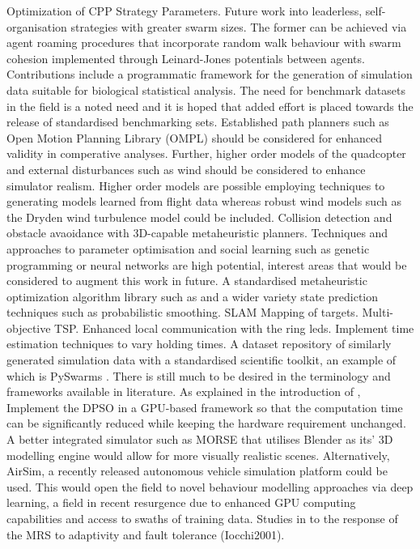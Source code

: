 \documentclass{report}
\begin{document}
Optimization of CPP Strategy Parameters. Future work into leaderless, self-organisation strategies with greater swarm sizes. The former can be achieved via agent roaming procedures that incorporate random walk behaviour with swarm cohesion implemented through Leinard-Jones potentials between agents.
Contributions include a programmatic framework for the generation of simulation data suitable for biological statistical analysis. The need for benchmark datasets in the field is a noted need and it is hoped that added effort is placed towards the release of standardised benchmarking sets.
Established path planners such as Open Motion Planning Library (OMPL) \cite{Sucan2012} should be considered for enhanced validity in comperative analyses. Further, higher order models of the quadcopter and external disturbances such as wind should be considered to enhance simulator realism. Higher order models are possible employing techniques to generating models learned from flight data \cite{Symington2014} whereas robust wind models such as the Dryden wind turbulence model \cite{Dryden} could be included. Collision detection and obstacle avaoidance with 3D-capable metaheuristic planners. Techniques and approaches to parameter optimisation and social learning such as genetic programming or neural networks are high potential, interest areas that would be considered to augment this work in future.
A standardised metaheuristic optimization algorithm library such as \cite{James2018} and a wider variety state prediction techniques such as probabilistic smoothing.
SLAM Mapping of targets.
Multi-objective TSP.
Enhanced local communication with the ring leds.
Implement time estimation techniques to vary holding times.
A dataset repository of similarly generated simulation data with a standardised scientific toolkit, an example of which is PySwarms \cite{James2018}.
There is still much to be desired in the terminology and frameworks available in literature.
As explained in the introduction of \cite{Phung2017}, Implement the DPSO in a GPU-based framework so that the computation time can be significantly reduced while keeping the hardware requirement unchanged.
A better integrated simulator such as MORSE that utilises Blender as its' 3D modelling engine would allow for more visually realistic scenes. Alternatively, AirSim, a recently released autonomous vehicle simulation platform could be used. This would open the field to novel behaviour modelling approaches via deep learning, a field in recent resurgence due to enhanced GPU computing capabilities and access to swaths of training data.
Studies in to the response of the MRS to adaptivity and fault tolerance (Iocchi2001).
\end{document}
